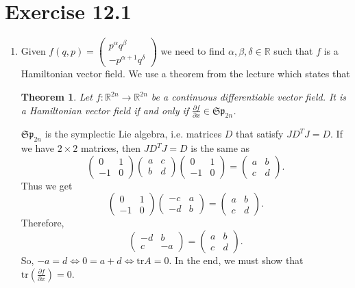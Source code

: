 \documentclass[a4paper]{article}
\theoremstyle{plain}
\newtheorem*{theorem}{Theorem}
\begin{document}
\section*{Exercise 12.1}
\begin{enumerate}[label=(\roman*)]
	\item Given $f(q,p) = \begin{pmatrix}
		p^{\alpha}q^{\beta} \\ -p^{\alpha + 1} q^{\delta}
	\end{pmatrix}$
	we need to find $\alpha, \beta, \delta \in \mathbb R$ such that $f$ is a Hamiltonian vector field. We use a theorem from the lecture which states that
	\begin{theorem}
		Let $f: \mathbb R^{2n} \to \mathbb R^{2n}$ be a continuous differentiable vector field. It is a Hamiltonian vector field if and only if $\frac{\partial f}{\partial x} \in \mathfrak{Sp}_{2n}$.
	\end{theorem}
	$\mathfrak{Sp}_{2n}$ is the symplectic Lie algebra, i.e. matrices $D$ that satisfy $JD^TJ = D$. If we have $2 \times 2$ matrices, then $JD^TJ = D$ is the same as 
	\[
		\begin{pmatrix}
			0 & 1 \\ -1 & 0
		\end{pmatrix} \begin{pmatrix}
			a & c \\ b & d
		\end{pmatrix} \begin{pmatrix}
		0 & 1 \\ -1 & 0
		\end{pmatrix}  = \begin{pmatrix}
		a & b \\ c & d
		\end{pmatrix}. 
	\]
	Thus we get
	\[
		\begin{pmatrix}
		0 & 1 \\ -1 & 0
		\end{pmatrix} \begin{pmatrix}
			-c & a \\ -d & b
		\end{pmatrix} = \begin{pmatrix}
		a & b \\ c & d
		\end{pmatrix}. 
	\]
	Therefore,
	\[
		\begin{pmatrix}
		-d & b \\ c & -a
		\end{pmatrix} = \begin{pmatrix}
		a & b \\ c & d
		\end{pmatrix}.
	\]
	So, $-a = d \iff 0 = a+d \iff \mathrm{tr}A = 0$. In the end, we must show that $\mathrm{tr}(\frac{\partial f}{\partial x}) = 0$.
	

\end{enumerate}
\end{document}
